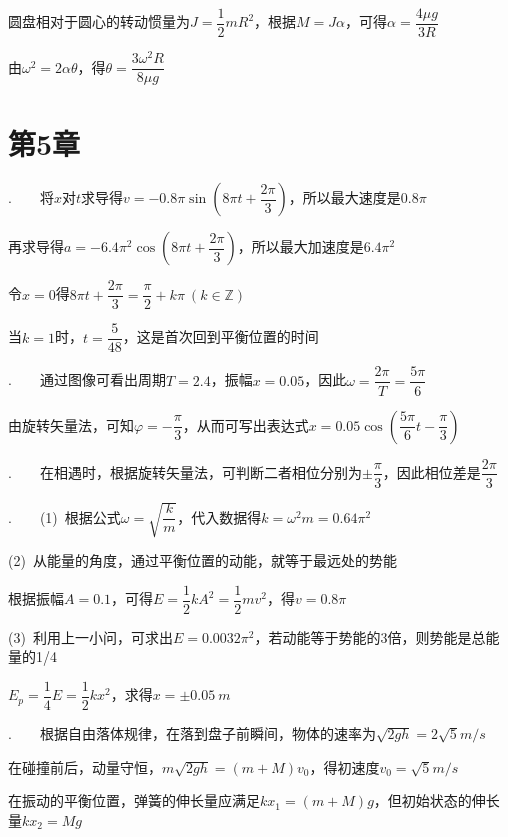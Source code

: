 圆盘相对于圆心的转动惯量为$J=\dfrac{1}{2}mR^2$，根据$M=J\alpha$，可得$\alpha=\dfrac{4\mu g}{3R}$

由$\omega^2=2\alpha \theta$，得$\theta=\dfrac{3\omega^2R}{8\mu g}$

\section*{第5章}

.~~~~将$x$对$t$求导得$v=-0.8\pi\sin\left(8\pi t+\dfrac{2\pi}{3}\right)$，所以最大速度是$0.8\pi$

再求导得$a=-6.4\pi^2\cos \left(8\pi t+\dfrac{2\pi}{3}\right)$，所以最大加速度是$6.4\pi^2$

令$x=0$得$8\pi t+\dfrac{2\pi}{3}=\dfrac{\pi}{2}+k\pi~(k\in \mathbb{Z})$

当$k=1$时，$t=\dfrac{5}{48}$，这是首次回到平衡位置的时间

\noindent\hdashrule{\textwidth}{1pt}{1pt}

.~~~~通过图像可看出周期$T=2.4$，振幅$x=0.05$，因此$\omega=\dfrac{2\pi}{T}=\dfrac{5\pi}{6}$

由旋转矢量法，可知$\varphi=-\dfrac{\pi}{3}$，从而可写出表达式$x=0.05\cos\left(\dfrac{5\pi}{6}t-\dfrac{\pi}{3}\right)$

\noindent\hdashrule{\textwidth}{1pt}{1pt}

.~~~~在相遇时，根据旋转矢量法，可判断二者相位分别为$\pm\dfrac{\pi}{3}$，因此相位差是$\dfrac{2\pi}{3}$


.~~~~(1)~根据公式$\omega=\sqrt{\dfrac{k}{m}}$，代入数据得$k=\omega^2 m=0.64\pi^2$

(2)~从能量的角度，通过平衡位置的动能，就等于最远处的势能

根据振幅$A=0.1$，可得$E=\dfrac{1}{2}kA^2=\dfrac{1}{2}mv^2$，得$v=0.8\pi$

(3)~利用上一小问，可求出$E=0.0032\pi^2$，若动能等于势能的3倍，则势能是总能量的1/4

$E_p=\dfrac{1}{4}E=\dfrac{1}{2}kx^2$，求得$x=\pm\SI{0.05}{m}$

\noindent\hdashrule{\textwidth}{1pt}{1pt}

.~~~~根据自由落体规律，在落到盘子前瞬间，物体的速率为$\sqrt{2gh}=2\sqrt{5}\unit{m/s}$

在碰撞前后，动量守恒，$m\sqrt{2gh}=(m+M)v_0$，得初速度$v_0=\sqrt{5}\unit{m/s}$

在振动的平衡位置，弹簧的伸长量应满足$kx_1=(m+M)g$，但初始状态的伸长量$kx_2=Mg$


